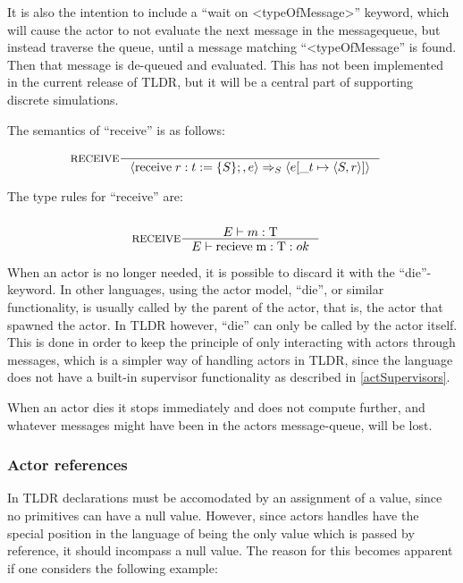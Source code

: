 It is also the intention to include a \enquote{wait on <typeOfMessage>} keyword, which will cause the actor to not evaluate the next message in the messagequeue, but instead traverse the queue, until a message matching \enquote{<typeOfMessage} is found. Then that message is de-queued and evaluated. This has not been implemented in the current release of TLDR, but it will be a central part of supporting discrete simulations.

The semantics of \enquote{receive} is as follows:

\begin{align*}
&\inference[$\text{RECEIVE}$]{}
                           {\Braket{\Treceive r:t := \{S\};,e} \Rightarrow_S \Braket{e[\_t \mapsto \Braket{S,r}]}}
\end{align*}

The type rules for \enquote{receive} are:

\begin{align*}
\intertext{}
&\inference[RECEIVE]{\Tenv m : \Tt}
                 {\Tenv \mathbin{\text{recieve}} \; \mathbin{\text{m}} :\Tt : ok }
\end{align*}

When an actor is no longer needed, it is possible to discard it with the \enquote{die}-keyword. In other languages, using the actor model, \enquote{die}, or similar functionality, is usually called by the parent of the actor, that is, the actor that spawned the actor. In TLDR however, \enquote{die} can only be called by the actor itself. This is done in order to keep the principle of only interacting with actors through messages, which is a simpler way of handling actors in TLDR, since the language does not have a built-in supervisor functionality as described in \cref{actSupervisors}. 

When an actor dies it stops immediately and does not compute further, and whatever messages might have been in the actors message-queue, will be lost. 

\subsubsection{Actor references}

In TLDR declarations must be accomodated by an assignment of a value, since no primitives can have a null value. However, since actors handles have the special position in the language of being the only value which is passed by reference, it should incompass a null value. The reason for this becomes apparent if one considers the following example:

